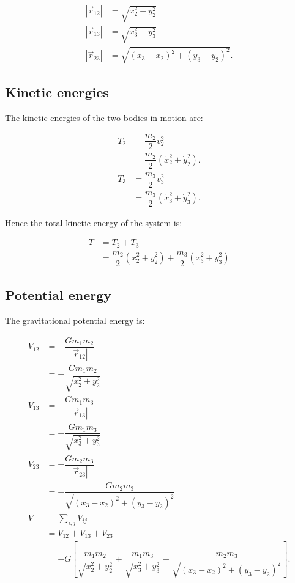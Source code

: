 \documentclass[12pt,a4paper,portrait]{article}
\begin{document}
	\begin{align*}
		\left|\vec{r}_{12}\right| &= \sqrt{x_2^2+y_2^2} \\
		\left|\vec{r}_{13}\right| &= \sqrt{x_3^2+y_3^2} \\
		\left|\vec{r}_{23}\right| &= \sqrt{(x_3-x_2)^2+(y_3-y_2)^2}.
	\end{align*}
	
	\subsection{Kinetic energies}
	
	The kinetic energies of the two bodies in motion are:
	
	\begin{align*}
		T_2 &= \dfrac{m_2}{2} v_2^2 \\
		&= \dfrac{m_2}{2} \left(\dot{x}_2^2 + \dot{y}_2^2\right). \\
		T_3 &= \dfrac{m_3}{2}v_3^2 \\
		&= \dfrac{m_3}{2} \left(\dot{x}_3^2 + \dot{y}_3^2\right).
	\end{align*}
	
	Hence the total kinetic energy of the system is:
	
	\begin{align*}
		T &= T_2 + T_3 \\
		&= \dfrac{m_2}{2} \left(\dot{x}_2^2 + \dot{y}_2^2\right) + \dfrac{m_3}{2} \left(\dot{x}_3^2 + \dot{y}_3^2\right)
	\end{align*}
	
	\subsection{Potential energy}
	The gravitational potential energy is:
	
	\begin{align*}
		V_{12} &= -\dfrac{Gm_1m_2}{|\vec{r}_{12}|} \\
		&= -\dfrac{Gm_1m_2}{\sqrt{x_2^2+y_2^2}}\\
		V_{13} &= -\dfrac{Gm_1m_3}{|\vec{r}_{13}|} \\
		&= -\dfrac{Gm_1 m_3}{\sqrt{x_3^2+y_3^2}} \\
		V_{23} &= -\dfrac{Gm_2m_3}{|\vec{r}_{23}|} \\
		&= -\dfrac{Gm_2 m_3}{\sqrt{(x_3-x_2)^2+(y_3-y_2)^2}} \\
		V &= \sum_{i,j} V_{ij} \\
		&= V_{12}+V_{13} +V_{23} \\
		&= -G\left[\dfrac{m_1m_2}{\sqrt{x_2^2+y_2^2}} + \dfrac{m_1 m_3}{\sqrt{x_3^2+y_3^2}} + \dfrac{m_2 m_3}{\sqrt{(x_3-x_2)^2+(y_3-y_2)^2}}\right].
	\end{align*}
	
\end{document}
